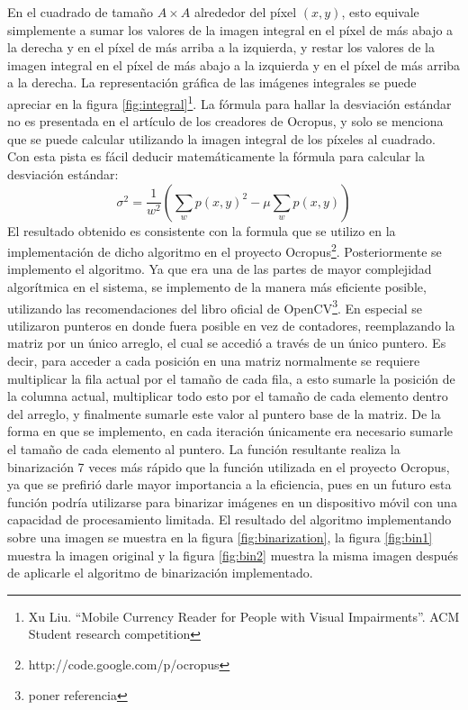 \documentclass[a4paper, 11pt, oneside]{report}
\begin{document}
En el cuadrado de tamaño $A \times A$ alrededor del píxel $(x, y)$, esto equivale simplemente a sumar los valores de la imagen integral en el píxel de más abajo a la derecha y en el píxel de más arriba a la izquierda, y restar los valores de la imagen integral en el píxel de más abajo a la izquierda y en el píxel de más arriba a la derecha. La representación gráfica de las imágenes integrales se puede apreciar en la figura \ref{fig:integral}\footnote{Xu Liu. ``Mobile Currency Reader for People with Visual Impairments''. ACM Student research competition}. La fórmula para hallar la desviación estándar no es presentada en el artículo de los creadores de Ocropus, y solo se menciona que se puede calcular utilizando la imagen integral de los píxeles al cuadrado. Con esta pista es fácil deducir matemáticamente la fórmula para calcular la desviación estándar:
\[ \sigma^2 = \frac{1}{w^2}\left(\sum_w{p(x,y)^2} - \mu \sum_w{p(x,y)}\right) \]
El resultado obtenido es consistente con la formula que se utilizo en la implementación de dicho algoritmo en el proyecto Ocropus\footnote{http://code.google.com/p/ocropus}.
Posteriormente se implemento el algoritmo. Ya que era una de las partes de mayor complejidad algorítmica en el sistema, se implemento de la manera más eficiente posible, utilizando las recomendaciones del libro oficial de OpenCV\footnote{poner referencia}. En especial se utilizaron punteros en donde fuera posible en vez de contadores, reemplazando la matriz por un único arreglo, el cual se accedió a través de un único puntero. Es decir, para acceder a cada posición en una matriz normalmente se requiere multiplicar la fila actual por el tamaño de cada fila, a esto sumarle la posición de la columna actual, multiplicar todo esto por el tamaño de cada elemento dentro del arreglo, y finalmente sumarle este valor al puntero base de la matriz. De la forma en que se implemento, en cada iteración únicamente era necesario sumarle el tamaño de cada elemento al puntero. La función resultante realiza la binarización 7 veces más rápido que la función utilizada en el proyecto Ocropus, ya que se prefirió darle mayor importancia a la eficiencia, pues en un futuro esta función podría utilizarse para binarizar imágenes en un dispositivo móvil con una capacidad de procesamiento limitada. El resultado del algoritmo implementando sobre una imagen se muestra en la figura \ref{fig:binarization}, la figura \ref{fig:bin1} muestra la imagen original y la figura \ref{fig:bin2} muestra la misma imagen después de aplicarle el algoritmo de binarización implementado.
\end{document}
